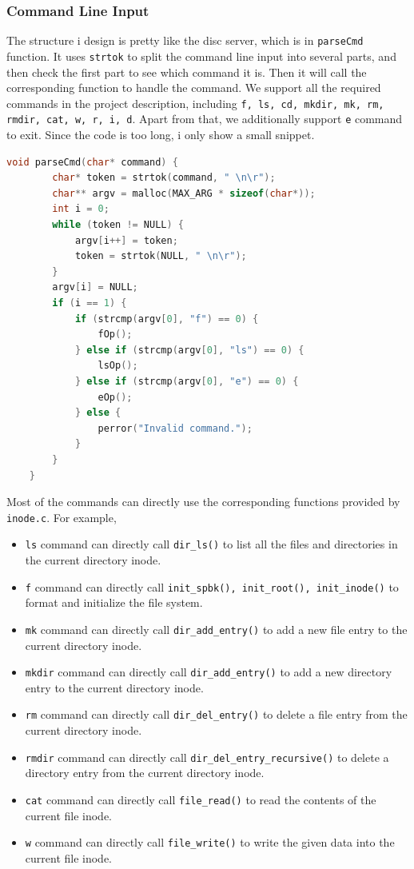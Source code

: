\subsubsection{Command Line Input}
The structure i design is pretty like the disc server, which is in \texttt{parseCmd} function.
It uses \texttt{strtok} to split the command line input into several parts, and then check the first part to see which command it is.
Then it will call the corresponding function to handle the command. We support all the required commands in the project description, including \texttt{f, ls, cd, mkdir, mk, rm, rmdir, cat, w, r, i, d}.
Apart from that, we additionally support \texttt{e} command to exit. Since the code is too long, i only show a small snippet.

\begin{lstlisting}[language=C]
    void parseCmd(char* command) {
        char* token = strtok(command, " \n\r");
        char** argv = malloc(MAX_ARG * sizeof(char*));
        int i = 0;
        while (token != NULL) {
            argv[i++] = token;
            token = strtok(NULL, " \n\r");
        }
        argv[i] = NULL;
        if (i == 1) {
            if (strcmp(argv[0], "f") == 0) {
                fOp();
            } else if (strcmp(argv[0], "ls") == 0) {
                lsOp();
            } else if (strcmp(argv[0], "e") == 0) {
                eOp();
            } else {
                perror("Invalid command.");
            }
        } 
    }    
\end{lstlisting}

Most of the commands can directly use the corresponding functions provided by \texttt{inode.c}.
For example, 
\begin{itemize}
    \item \texttt{ls} command can directly call \texttt{dir\_ls()} to list all the files and directories in the current directory inode.
    \item \texttt{f} command can directly call \texttt{init\_spbk(), init\_root(), init\_inode()} to format and initialize the file system.
    \item \texttt{mk} command can directly call \texttt{dir\_add\_entry()} to add a new file entry to the current directory inode.
    \item \texttt{mkdir} command can directly call \texttt{dir\_add\_entry()} to add a new directory entry to the current directory inode.
    \item \texttt{rm} command can directly call \texttt{dir\_del\_entry()} to delete a file entry from the current directory inode.
    \item \texttt{rmdir} command can directly call \texttt{dir\_del\_entry\_recursive()} to delete a directory entry from the current directory inode.
    \item \texttt{cat} command can directly call \texttt{file\_read()} to read the contents of the current file inode.
    \item \texttt{w} command can directly call \texttt{file\_write()} to write the given data into the current file inode.
\end{itemize}

